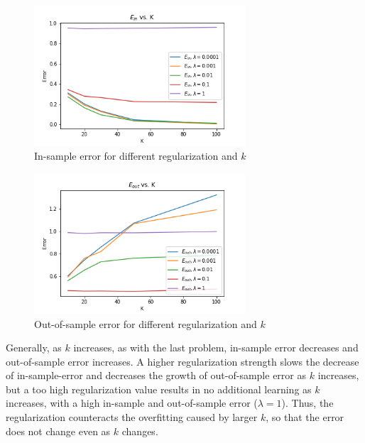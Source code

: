 \begin{solution}
    \begin{figure}[H]
    \begin{center}
        \includegraphics[width=0.7\textwidth]{plots/2e_ein.png}
        \caption{In-sample error for different regularization and $k$}
    \end{center}
    \end{figure}

    \begin{figure}[H]
    \begin{center}
        \includegraphics[width=0.7\textwidth]{plots/2e_eout.png}
        \caption{Out-of-sample error for different regularization and $k$}
    \end{center}
    \end{figure}

    Generally, as $k$ increases, as with the last problem, in-sample error decreases and out-of-sample error increases. A higher regularization strength slows the decrease of in-sample-error and decreases the growth of out-of-sample error as $k$ increases, but a too high regularization value results in no additional learning as $k$ increases, with a high in-sample and out-of-sample error ($\lambda = 1$). Thus, the regularization counteracts the overfitting caused by larger $k$, so that the error does not change even as $k$ changes.
\end{solution}






